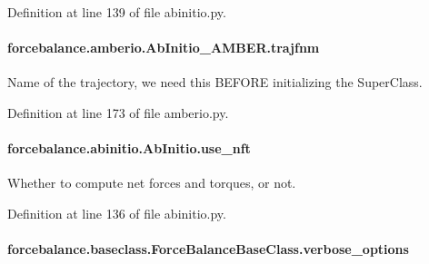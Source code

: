 Definition at line 139 of file abinitio.\-py.

\hypertarget{classforcebalance_1_1amberio_1_1AbInitio__AMBER_a5521a1a249650355e3e1f20eb3a0c25b}{
\paragraph[{trajfnm}]{\setlength{\rightskip}{0pt plus 5cm}forcebalance.\-amberio.\-Ab\-Initio\-\_\-\-A\-M\-B\-E\-R.\-trajfnm}}\label{classforcebalance_1_1amberio_1_1AbInitio__AMBER_a5521a1a249650355e3e1f20eb3a0c25b}


Name of the trajectory, we need this B\-E\-F\-O\-R\-E initializing the Super\-Class. 



Definition at line 173 of file amberio.\-py.

\hypertarget{classforcebalance_1_1abinitio_1_1AbInitio_afd8d179560a295ffa6c6309843c59279}{
\paragraph[{use\-\_\-nft}]{\setlength{\rightskip}{0pt plus 5cm}forcebalance.\-abinitio.\-Ab\-Initio.\-use\-\_\-nft\hspace{0.3cm}{\ttfamily [inherited]}}}\label{classforcebalance_1_1abinitio_1_1AbInitio_afd8d179560a295ffa6c6309843c59279}


Whether to compute net forces and torques, or not. 



Definition at line 136 of file abinitio.\-py.

\hypertarget{classforcebalance_1_1baseclass_1_1ForceBalanceBaseClass_a8088e1e20cbd6bc175fb9c9fe9fa0f18}{
\paragraph[{verbose\-\_\-options}]{\setlength{\rightskip}{0pt plus 5cm}forcebalance.\-baseclass.\-Force\-Balance\-Base\-Class.\-verbose\-\_\-options\hspace{0.3cm}{\ttfamily [inherited]}}}\label{classforcebalance_1_1baseclass_1_1ForceBalanceBaseClass_a8088e1e20cbd6bc175fb9c9fe9fa0f18}


